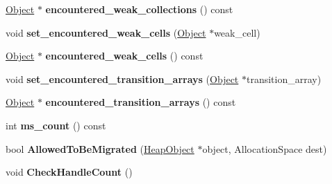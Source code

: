 \begin{DoxyCompactItemize}
\item 
\hyperlink{classv8_1_1internal_1_1_object}{Object} $\ast$ {\bfseries encountered\+\_\+weak\+\_\+collections} () const \hypertarget{classv8_1_1internal_1_1_heap_a26510220c8b492fd890bc6cb606f83b8}{}\label{classv8_1_1internal_1_1_heap_a26510220c8b492fd890bc6cb606f83b8}

\item 
void {\bfseries set\+\_\+encountered\+\_\+weak\+\_\+cells} (\hyperlink{classv8_1_1internal_1_1_object}{Object} $\ast$weak\+\_\+cell)\hypertarget{classv8_1_1internal_1_1_heap_a0c1b1b1e2bd041ef9c2656810154663f}{}\label{classv8_1_1internal_1_1_heap_a0c1b1b1e2bd041ef9c2656810154663f}

\item 
\hyperlink{classv8_1_1internal_1_1_object}{Object} $\ast$ {\bfseries encountered\+\_\+weak\+\_\+cells} () const \hypertarget{classv8_1_1internal_1_1_heap_a792c0c4157671f9f3a80e143f0590422}{}\label{classv8_1_1internal_1_1_heap_a792c0c4157671f9f3a80e143f0590422}

\item 
void {\bfseries set\+\_\+encountered\+\_\+transition\+\_\+arrays} (\hyperlink{classv8_1_1internal_1_1_object}{Object} $\ast$transition\+\_\+array)\hypertarget{classv8_1_1internal_1_1_heap_a7fa5cab6c26051664ee33a8be042f54b}{}\label{classv8_1_1internal_1_1_heap_a7fa5cab6c26051664ee33a8be042f54b}

\item 
\hyperlink{classv8_1_1internal_1_1_object}{Object} $\ast$ {\bfseries encountered\+\_\+transition\+\_\+arrays} () const \hypertarget{classv8_1_1internal_1_1_heap_a1c9f37641b8f433d1f43a424f3e12a2d}{}\label{classv8_1_1internal_1_1_heap_a1c9f37641b8f433d1f43a424f3e12a2d}

\item 
int {\bfseries ms\+\_\+count} () const \hypertarget{classv8_1_1internal_1_1_heap_a8cd3a1e6bf41ce50d2de8e3e14719eb0}{}\label{classv8_1_1internal_1_1_heap_a8cd3a1e6bf41ce50d2de8e3e14719eb0}

\item 
bool {\bfseries Allowed\+To\+Be\+Migrated} (\hyperlink{classv8_1_1internal_1_1_heap_object}{Heap\+Object} $\ast$object, Allocation\+Space dest)\hypertarget{classv8_1_1internal_1_1_heap_a6afbe2cbd6f999c32a9179b2558e3978}{}\label{classv8_1_1internal_1_1_heap_a6afbe2cbd6f999c32a9179b2558e3978}

\item 
void {\bfseries Check\+Handle\+Count} ()\hypertarget{classv8_1_1internal_1_1_heap_a681c0f8989fff3c18c4659a990da4712}{}\label{classv8_1_1internal_1_1_heap_a681c0f8989fff3c18c4659a990da4712}


\end{DoxyCompactItemize}
